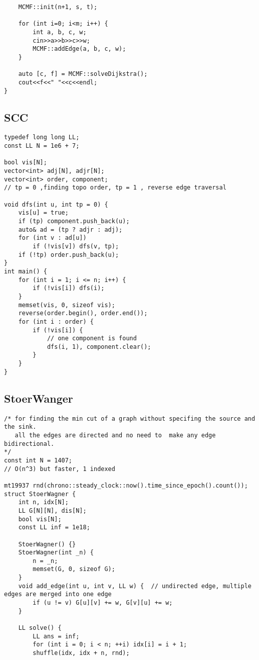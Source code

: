 \documentclass[FSZ,a4paper,onesided]{article}
\begin{document}
\begin{multicols*}{\COLS}
\begin{lstlisting}
    MCMF::init(n+1, s, t);

    for (int i=0; i<m; i++) {
        int a, b, c, w;
        cin>>a>>b>>c>>w;
        MCMF::addEdge(a, b, c, w);
    }

    auto [c, f] = MCMF::solveDijkstra();
    cout<<f<<" "<<c<<endl;
}

\end{lstlisting}
\subsection{SCC}
\begin{lstlisting}
typedef long long LL;
const LL N = 1e6 + 7;

bool vis[N];
vector<int> adj[N], adjr[N];
vector<int> order, component;
// tp = 0 ,finding topo order, tp = 1 , reverse edge traversal

void dfs(int u, int tp = 0) {
    vis[u] = true;
    if (tp) component.push_back(u);
    auto& ad = (tp ? adjr : adj);
    for (int v : ad[u])
        if (!vis[v]) dfs(v, tp);
    if (!tp) order.push_back(u);
}
int main() {
    for (int i = 1; i <= n; i++) {
        if (!vis[i]) dfs(i);
    }
    memset(vis, 0, sizeof vis);
    reverse(order.begin(), order.end());
    for (int i : order) {
        if (!vis[i]) {
            // one component is found
            dfs(i, 1), component.clear();
        }
    }
}

\end{lstlisting}
\subsection{StoerWanger}
\begin{lstlisting}
/* for finding the min cut of a graph without specifing the source and  the sink.
   all the edges are directed and no need to  make any edge bidirectional.
*/
const int N = 1407;
// O(n^3) but faster, 1 indexed

mt19937 rnd(chrono::steady_clock::now().time_since_epoch().count());
struct StoerWagner {
    int n, idx[N];
    LL G[N][N], dis[N];
    bool vis[N];
    const LL inf = 1e18;

    StoerWagner() {}
    StoerWagner(int _n) {
        n = _n;
        memset(G, 0, sizeof G);
    }
    void add_edge(int u, int v, LL w) {  // undirected edge, multiple edges are merged into one edge
        if (u != v) G[u][v] += w, G[v][u] += w;
    }

    LL solve() {
        LL ans = inf;
        for (int i = 0; i < n; ++i) idx[i] = i + 1;
        shuffle(idx, idx + n, rnd);


\end{lstlisting}
\end{multicols*}
\end{document}
